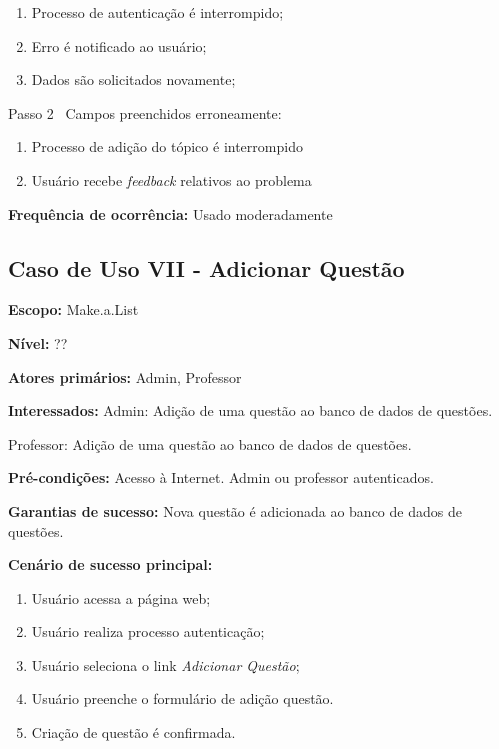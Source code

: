 \documentclass[12pt,oneside,a4paper,article]{abntex2}
\begin{document}
		\begin{enumerate}[label=\alph*.]	
			\item Processo de autenticação é interrompido;
			\item Erro é notificado ao usuário;
			\item Dados são solicitados novamente;
		\end{enumerate}
		
		Passo 2 \textrightarrow \ Campos preenchidos erroneamente:
		
		\begin{enumerate}[label=\alph*.]	
			\item Processo de adição do tópico é interrompido
			\item Usuário recebe \textit{feedback} relativos ao problema	
		\end{enumerate}
		
		\textbf{Frequência de ocorrência:} Usado moderadamente
	
		\subsection{Caso de Uso VII - Adicionar Questão}
		
		\textbf{Escopo:} Make.a.List 
		
		\textbf{Nível:} ??
		
		\textbf{Atores primários:} Admin, Professor
		
		\textbf{Interessados:} Admin: Adição de uma questão ao banco de dados de questões.
		
		Professor: Adição de uma questão ao banco de dados de questões.
		
		\textbf{Pré-condições:} Acesso à Internet. Admin ou professor autenticados.
		
		\textbf{Garantias de sucesso:} Nova questão é adicionada ao banco de dados de questões.
		
		\textbf{Cenário de sucesso principal:} 
		
		\begin{enumerate}
			\item Usuário acessa a página web;
			
			\item Usuário realiza processo autenticação;
			
			\item Usuário seleciona o link \textit{Adicionar Questão};
			
			\item Usuário preenche o formulário de adição questão.	
			
			\item Criação de questão é confirmada.
			
		\end{enumerate}
		
\end{document}
